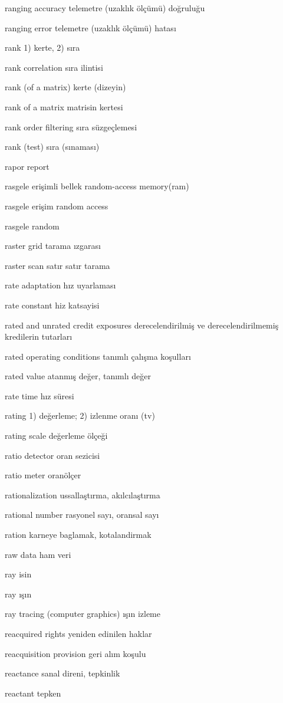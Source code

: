 \documentclass[12pt,fleqn]{article}\usepackage{../../common}
\begin{document}
ranging accuracy telemetre (uzaklık ölçümü) doğruluğu

ranging error telemetre (uzaklık ölçümü) hatası

rank 1) kerte, 2) sıra

rank correlation sıra ilintisi

rank (of a matrix) kerte (dizeyin)

rank of a matrix matrisin kertesi

rank order filtering sıra süzgeçlemesi

rank (test) sıra (sınaması)

rapor report

rasgele erişimli bellek random-access memory(ram)

rasgele erişim random access

rasgele random

raster grid tarama ızgarası

raster scan satır satır tarama

rate adaptation hız uyarlaması

rate constant hiz katsayisi

rated and unrated credit exposures derecelendirilmiş ve derecelendirilmemiş kredilerin tutarları

rated operating conditions tanımlı çalışma koşulları

rated value atanmış değer, tanımlı değer

rate time hız süresi

rating 1) değerleme; 2) izlenme oranı (tv)

rating scale değerleme ölçeği

ratio detector oran sezicisi

ratio meter oranölçer

rationalization ussallaştırma, akılcılaştırma\

rational number rasyonel sayı, oransal sayı

ration karneye baglamak, kotalandirmak

raw data ham veri

ray isin

ray ışın

ray tracing (computer graphics) ışın izleme

reacquired rights yeniden edinilen haklar

reacquisition provision geri alım koşulu

reactance sanal direni, tepkinlik

reactant tepken
\end{document}
